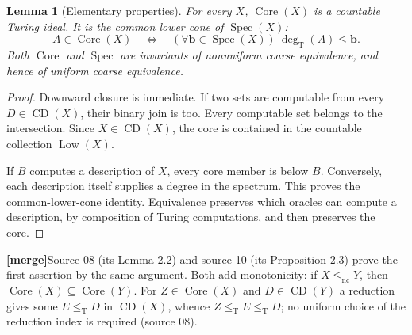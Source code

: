 \documentclass[11pt,letterpaper]{article}
\theoremstyle{plain}
\newtheorem{lemma}[theorem]{Lemma}
\theoremstyle{definition}
\theoremstyle{remark}
\numberwithin{equation}{section}
\newcommand{\leT}{\leq_{\mathrm T}}
\newcommand{\lenc}{\leq_{\mathrm{nc}}}
\newcommand{\Core}{\operatorname{Core}}
\newcommand{\CD}{\operatorname{CD}}
\newcommand{\Low}{\operatorname{Low}}
\newcommand{\Spec}{\operatorname{Spec}}
\newcommand{\degT}{\deg_{\mathrm T}}
\newcommand{\mergenote}[1]{\par\smallskip\noindent
 {\small\textsf{\textbf{[merge]}}\enspace #1}\par\smallskip}
\begin{document}
\begin{lemma}[Elementary properties]\label{cr12:lem:corebasic}
For every $X$, $\Core(X)$ is a countable Turing ideal. It is the common lower
cone of $\Spec(X)$:
\[
 A\in\Core(X)\quad\Longleftrightarrow\quad
 (\forall\mathbf b\in\Spec(X))\ \degT(A)\le\mathbf b.
\]
Both $\Core$ and $\Spec$ are invariants of nonuniform coarse equivalence,
and hence of uniform coarse equivalence.
\end{lemma}
\begin{proof}
Downward closure is immediate. If two sets are computable from every
$D\in\CD(X)$, their binary join is too. Every computable set belongs to the
intersection. Since $X\in\CD(X)$, the core is contained in the countable
collection $\Low(X)$.

If $B$ computes a description of $X$, every core member is below $B$. Conversely,
each description itself supplies a degree in the spectrum. This proves the
common-lower-cone identity. Equivalence preserves which oracles can compute a
description, by composition of Turing computations, and then preserves the core.
\end{proof}
\mergenote{Source 08 (its Lemma 2.2) and source 10 (its Proposition 2.3) prove the
first assertion by the same argument. Both add monotonicity: if $X\lenc Y$, then
$\Core(X)\subseteq\Core(Y)$. For $Z\in\Core(X)$ and $D\in\CD(Y)$ a reduction gives
some $E\leT D$ in $\CD(X)$, whence $Z\leT E\leT D$; no uniform choice of the
reduction index is required (source 08).}
\end{document}

